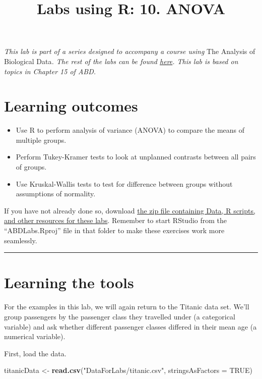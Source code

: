 \documentclass[
]{article}
\title{Labs using R: 10. ANOVA}
\author{}
\date{\vspace{-2.5em}}
\newenvironment{Shaded}{\begin{snugshade}}{\end{snugshade}}
\newcommand{\AttributeTok}[1]{\textcolor[rgb]{0.13,0.29,0.53}{#1}}
\newcommand{\ConstantTok}[1]{\textcolor[rgb]{0.56,0.35,0.01}{#1}}
\newcommand{\FunctionTok}[1]{\textcolor[rgb]{0.13,0.29,0.53}{\textbf{#1}}}
\newcommand{\NormalTok}[1]{#1}
\newcommand{\OtherTok}[1]{\textcolor[rgb]{0.56,0.35,0.01}{#1}}
\newcommand{\StringTok}[1]{\textcolor[rgb]{0.31,0.60,0.02}{#1}}
\begin{document}
\maketitle

{
\setcounter{tocdepth}{3}
\tableofcontents
}
\emph{This lab is part of a series designed to accompany a course using
}The Analysis of Biological Data\emph{. The rest of the labs can be
found \href{index.html}{here}. This lab is based on topics in Chapter 15
of ABD.}

\section{Learning outcomes}\label{learning-outcomes}

\begin{itemize}
\item
  Use R to perform analysis of variance (ANOVA) to compare the means of
  multiple groups.
\item
  Perform Tukey-Kramer tests to look at unplanned contrasts between all
  pairs of groups.
\item
  Use Kruskal-Wallis tests to test for difference between groups without
  assumptions of normality.
\end{itemize}

If you have not already done so, download \href{ABDLabs.zip}{the zip
file containing Data, R scripts, and other resources for these labs}.
Remember to start RStudio from the ``ABDLabs.Rproj'' file in that folder
to make these exercises work more seamlessly.

\begin{center}\rule{0.5\linewidth}{0.5pt}\end{center}

\section{Learning the tools}\label{learning-the-tools}

For the examples in this lab, we will again return to the Titanic data
set. We'll group passengers by the passenger class they travelled under
(a categorical variable) and ask whether different passenger classes
differed in their mean age (a numerical variable).

First, load the data.

\begin{Shaded}
\begin{Highlighting}[]
\NormalTok{titanicData }\OtherTok{\textless{}{-}} \FunctionTok{read.csv}\NormalTok{(}\StringTok{"DataForLabs/titanic.csv"}\NormalTok{, }\AttributeTok{stringsAsFactors =} \ConstantTok{TRUE}\NormalTok{)}
\end{Highlighting}
\end{Shaded}
\end{document}
